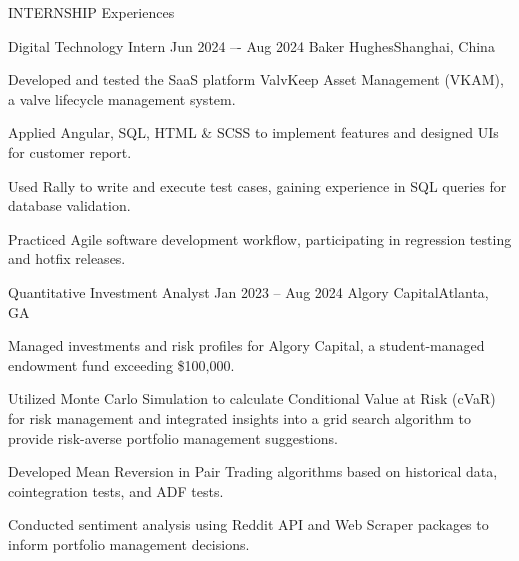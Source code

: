 \documentclass[10pt, letterpaper]{resume} %
\begin{document}
\begin{rSection}{INTERNSHIP Experiences} \itemsep -3pt  

\begin{rSubsection}
	{Digital Technology Intern}
	{Jun 2024 –- Aug 2024}
	{Baker Hughes\hfill{Shanghai, China}}
	
	\item Developed and tested the SaaS platform ValvKeep Asset Management (VKAM), a valve lifecycle management system. 
	\item Applied Angular, SQL, HTML \& SCSS to implement features and designed UIs for customer report.
	\item Used Rally to write and execute test cases, gaining experience in SQL queries for database validation. 
	\item Practiced Agile software development workflow, participating in regression testing and hotfix releases. 
\end{rSubsection}

\begin{rSubsection}
	{Quantitative Investment Analyst}
	{Jan 2023 -- Aug 2024}
	{Algory Capital\hfill{Atlanta, GA}}
	
	\item Managed investments and risk profiles for Algory Capital, a student-managed endowment fund exceeding \$100,000.
	\item Utilized Monte Carlo Simulation to calculate Conditional Value at Risk (cVaR) for risk management and integrated insights into a grid search algorithm to provide risk-averse portfolio management suggestions.
	\item Developed Mean Reversion in Pair Trading algorithms based on historical data, cointegration tests, and ADF tests. 
	\item Conducted sentiment analysis using Reddit API and Web Scraper packages to inform portfolio management decisions.
\end{rSubsection}
 
\end{rSection} 

  
%
%
%
  

\end{document}
